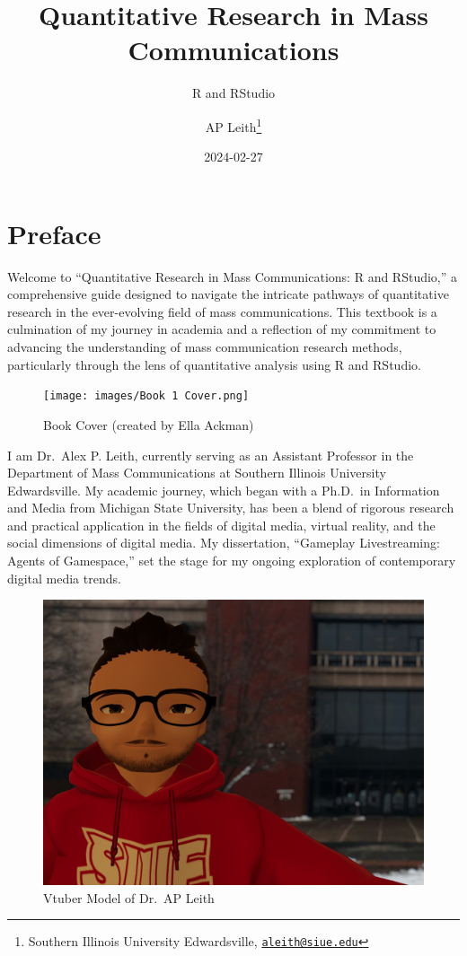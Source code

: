 \documentclass[
]{book}
\title{Quantitative Research in Mass Communications}
\subtitle{R and RStudio}
\author{AP Leith\footnote{Southern Illinois University Edwardsville, \href{mailto:aleith@siue.edu}{\nolinkurl{aleith@siue.edu}}}}
\date{2024-02-27}
\begin{document}
\maketitle

{
\setcounter{tocdepth}{1}
\tableofcontents
}
\hypertarget{preface}{%
\chapter{Preface}\label{preface}}

Welcome to ``Quantitative Research in Mass Communications: R and RStudio,'' a comprehensive guide designed to navigate the intricate pathways of quantitative research in the ever-evolving field of mass communications. This textbook is a culmination of my journey in academia and a reflection of my commitment to advancing the understanding of mass communication research methods, particularly through the lens of quantitative analysis using R and RStudio.

\begin{figure}
\centering
\texttt{[image: images/Book 1 Cover.png]}
\caption{Book Cover (created by Ella Ackman)}
\end{figure}

I am Dr.~Alex P. Leith, currently serving as an Assistant Professor in the Department of Mass Communications at Southern Illinois University Edwardsville. My academic journey, which began with a Ph.D.~in Information and Media from Michigan State University, has been a blend of rigorous research and practical application in the fields of digital media, virtual reality, and the social dimensions of digital media. My dissertation, ``Gameplay Livestreaming: Agents of Gamespace,'' set the stage for my ongoing exploration of contemporary digital media trends.

\begin{figure}
\centering
\includegraphics[width=1\textwidth,height=\textheight]{images/fat_red_hoody_profile.png}
\caption{Vtuber Model of Dr.~AP Leith}
\end{figure}
\end{document}

